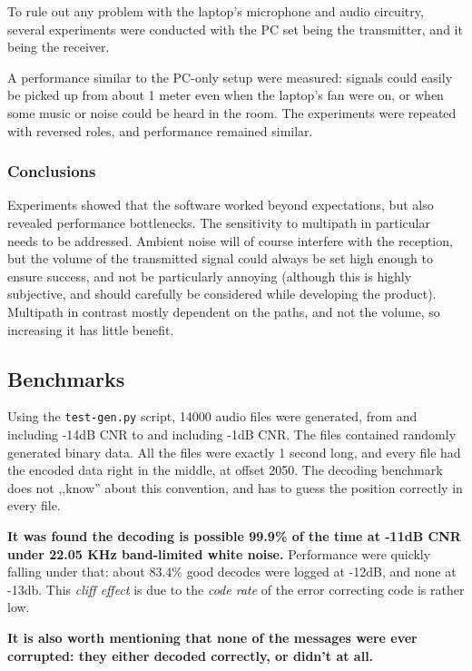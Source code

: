 \documentclass[a4paper]{article}
\begin{document}
To rule out any problem with the laptop's microphone and audio 
circuitry, several experiments were conducted with the PC set being the 
transmitter, and it being the receiver.

A performance similar to the PC-only setup were measured: signals could 
easily be picked up from about 1 meter even when the laptop's fan were 
on, or when some music or noise could be heard in the room. The
experiments were repeated with reversed roles, and performance remained
similar.

\subsubsection{Conclusions}

Experiments showed that the software worked beyond expectations, but also
revealed performance bottlenecks. The sensitivity to multipath in
particular needs to be addressed. Ambient noise will of course interfere
with the reception, but the volume of the transmitted signal could always
be set high enough to ensure success, and not be particularly annoying
(although this is highly subjective, and should carefully be considered
while developing the product). Multipath in contrast mostly dependent on
the paths, and not the volume, so increasing it has little benefit.

\subsection{Benchmarks}

Using the \texttt{test-gen.py} script, 14000 audio files were 
generated, from and including -14dB CNR to and including -1dB CNR. The 
files contained randomly generated binary data. All the files were 
exactly 1 second long, and every file had the encoded data right in the 
middle, at offset 2050. The decoding benchmark does not ,,know'' about 
this convention, and has to guess the position correctly in every file.

\textbf{It was found the decoding is possible 99.9\% of the time at 
-11dB CNR under 22.05 KHz band-limited white noise.} Performance were 
quickly falling under that: about 83.4\% good decodes were logged at 
-12dB, and none at -13db. This \emph{cliff effect} is due to the 
\emph{code rate} of the error correcting code is rather low.

\textbf{It is also worth mentioning that none of the messages were ever 
corrupted: they either decoded correctly, or didn't at all.}
\end{document}
